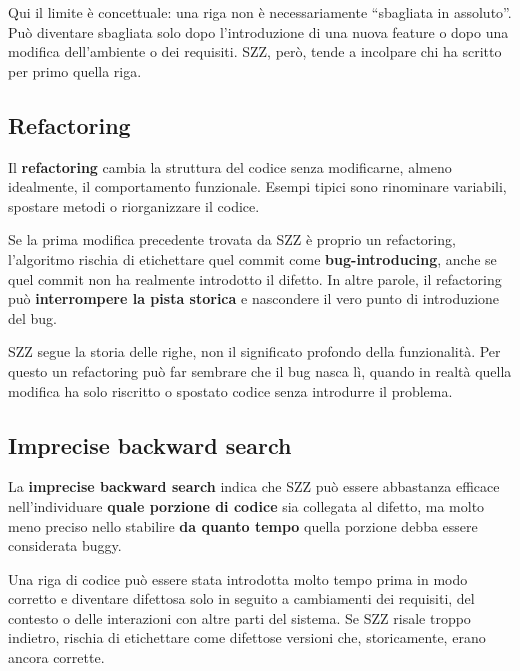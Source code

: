\begin{notaprof}
Qui il limite è concettuale: una riga non è necessariamente ``sbagliata in assoluto''. Può diventare sbagliata solo dopo l'introduzione di una nuova feature o dopo una modifica dell'ambiente o dei requisiti. SZZ, però, tende a incolpare chi ha scritto per primo quella riga.
\end{notaprof}

\subsection{Refactoring}

Il \textbf{refactoring} cambia la struttura del codice senza modificarne, almeno idealmente, il comportamento funzionale. Esempi tipici sono rinominare variabili, spostare metodi o riorganizzare il codice.

Se la prima modifica precedente trovata da SZZ è proprio un refactoring, l'algoritmo rischia di etichettare quel commit come \textbf{bug-introducing}, anche se quel commit non ha realmente introdotto il difetto. In altre parole, il refactoring può \textbf{interrompere la pista storica} e nascondere il vero punto di introduzione del bug.

\begin{notaprof}
SZZ segue la storia delle righe, non il significato profondo della funzionalità. Per questo un refactoring può far sembrare che il bug nasca lì, quando in realtà quella modifica ha solo riscritto o spostato codice senza introdurre il problema.
\end{notaprof}

\subsection{Imprecise backward search}

La \textbf{imprecise backward search} indica che SZZ può essere abbastanza efficace nell'individuare \textbf{quale porzione di codice} sia collegata al difetto, ma molto meno preciso nello stabilire \textbf{da quanto tempo} quella porzione debba essere considerata buggy.

Una riga di codice può essere stata introdotta molto tempo prima in modo corretto e diventare difettosa solo in seguito a cambiamenti dei requisiti, del contesto o delle interazioni con altre parti del sistema. Se SZZ risale troppo indietro, rischia di etichettare come difettose versioni che, storicamente, erano ancora corrette.

